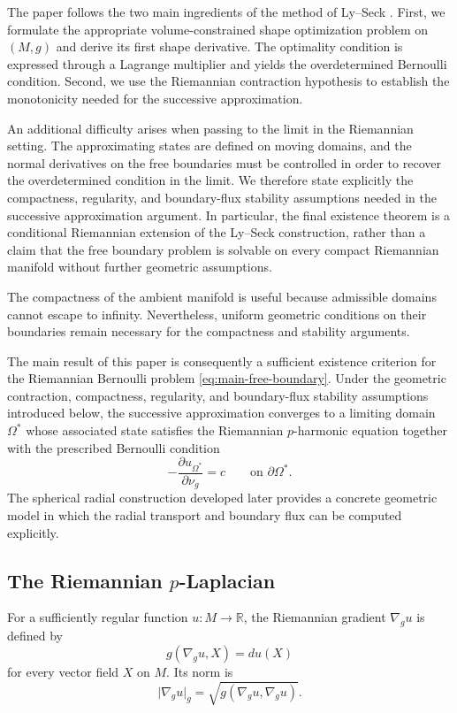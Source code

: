 \documentclass[11pt,a4paper]{article}
\theoremstyle{definition}
\theoremstyle{remark}
\newcommand{\R}{\mathbb{R}}
\newcommand{\gradg}{\nabla_g}
\newcommand{\normg}[1]{\lvert #1\rvert_g}
\begin{document}
The paper follows the two main ingredients of the method of
Ly--Seck \cite{LySeck2003}. First, we formulate the appropriate
volume-constrained shape optimization problem on $(M,g)$ and derive
its first shape derivative. The optimality condition is expressed
through a Lagrange multiplier and yields the overdetermined
Bernoulli condition. Second, we use the Riemannian contraction
hypothesis to establish the monotonicity needed for the successive
approximation.

An additional difficulty arises when passing to the limit in the
Riemannian setting. The approximating states are defined on moving
domains, and the normal derivatives on the free boundaries must be
controlled in order to recover the overdetermined condition in the
limit. We therefore state explicitly the compactness, regularity,
and boundary-flux stability assumptions needed in the successive
approximation argument. In particular, the final existence theorem
is a conditional Riemannian extension of the Ly--Seck construction,
rather than a claim that the free boundary problem is solvable on
every compact Riemannian manifold without further geometric
assumptions.

The compactness of the ambient manifold is useful because
admissible domains cannot escape to infinity. Nevertheless, uniform
geometric conditions on their boundaries remain necessary for the
compactness and stability arguments.

The main result of this paper is consequently a sufficient
existence criterion for the Riemannian Bernoulli problem
\eqref{eq:main-free-boundary}. Under the geometric contraction,
compactness, regularity, and boundary-flux stability assumptions
introduced below, the successive approximation converges to a
limiting domain $\Omega^\ast$ whose associated state satisfies the
Riemannian $p$-harmonic equation together with the prescribed
Bernoulli condition
\[
-\frac{\partial u_{\Omega^\ast}}{\partial\nu_g}=c
\qquad\text{on }\partial\Omega^\ast.
\]
The spherical radial construction developed later provides a
concrete geometric model in which the radial transport and boundary
flux can be computed explicitly.

\subsection{The Riemannian $p$-Laplacian}

For a sufficiently regular function $u:M\to\R$, the Riemannian
gradient $\gradg u$ is defined by
\[
g(\gradg u,X)=du(X)
\]
for every vector field $X$ on $M$. Its norm is
\[
\normg{\gradg u}
=
\sqrt{g(\gradg u,\gradg u)}.
\]
\end{document}
